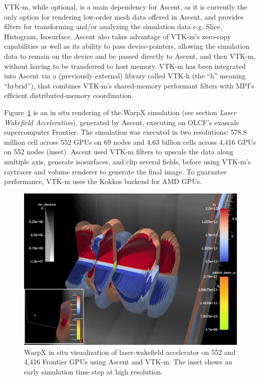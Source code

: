 VTK-m, while optional, is a main dependency for Ascent, as it is currently the only option for rendering low-order mesh data offered in Ascent, and provides filters for transforming and/or analyzing the simulation data e.g. Slice, Histogram, Isosurface. Ascent also takes advantage of VTK-m’s zero-copy capabilities as well as its ability to pass device-pointers, allowing the simulation data to remain on the device and be passed directly to Ascent, and then VTK-m, without having to be transferred to host memory. VTK-m has been integrated into Ascent via a (previously external) library called VTK-h (the “h” meaning “hybrid”), that combines VTK-m’s shared-memory performant filters with MPI’s efficient distributed-memory coordination. 

Figure~\ref{fig:warpx_lwfa} is an in situ rendering of the WarpX simulation (see section \textit{Laser Wakefield Acceleration}), generated by Ascent, executing on OLCF's exascale supercomputer Frontier.
The simulation was executed in two resolutions: 578.8 million cell across 552 GPUs on 69 nodes and 4.63 billion cells across 4,416 GPUs on 552 nodes (inset).
Ascent used VTK-m filters to upscale the data along multiple axis, generate isosurfaces, and clip several fields, before using VTK-m's raytracer and volume renderer to generate the final image.
To guarantee performance, VTK-m uses the Kokkos backend for AMD GPUs. 

\begin{figure}[htb]
  \includegraphics[width=\linewidth]{figures/warpx_stages_lwfa.png}
  \caption{WarpX in situ visualization of laser-wakefield accelerator on 552 and 4,416 Frontier GPUs using Ascent and VTK-m.
  The inset shows an early simulation time step at high resolution.}
  \label{fig:warpx_lwfa}
\end{figure}

